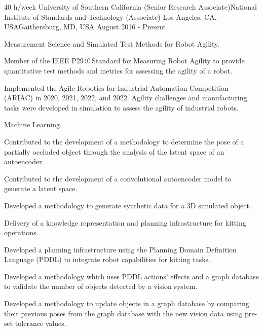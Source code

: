 \begin{cventries}
\cventry
{40 h/week} %
{University of Southern California (Senior Research Associate)\newline National Institute of Standards and Technology (Associate)} %
{Los Angeles, CA, USA\newline Gaithersburg, MD, USA} %
{August 2016 - Present} %
{ %
\begin{cvitems}
\item {Measurement Science and Simulated Test Methods for Robot Agility.}
    \begin{cvitems2}
    \item {Member of the IEEE P2940\texttrademark\,Standard for Measuring Robot Agility to provide quantitative test methods and metrics for assessing the agility of a robot.}
    \item {Implemented the Agile Robotics for Industrial Automation Competition (ARIAC) in 2020, 2021, 2022, and 2022. Agility challenges and manufacturing tasks were developed in simulation to assess the agility of industrial robots.}
    \end{cvitems2}
    \vspace{7pt}
\item {Machine Learning.}
    \begin{cvitems2}
    \item {Contributed to the development of a methodology to determine the pose of a partially occluded object through the analysis of the latent space of an autoencoder.}
    \item {Contributed to the development of a convolutional autoencoder model to generate a latent space.}
    \item {Developed a methodology to generate synthetic data for a 3D simulated object.}
    \end{cvitems2}
    \vspace{7pt}
\item {Delivery of a knowledge representation and planning infrastructure for kitting operations.}
    \begin{cvitems2}
    \item {Developed a planning infrastructure using the Planning Domain Definition Language (PDDL) to integrate robot capabilities for kitting tasks.}
    \item {Developed a methodology which uses PDDL actions' effects and a graph database to validate the number of objects detected by a vision system.}
    \item {Developed a methodology to update objects in a graph database by comparing their previous poses from the graph database with the new vision data using pre-set tolerance values.}
    \end{cvitems2}
\end{cvitems}
}




\end{cventries}
